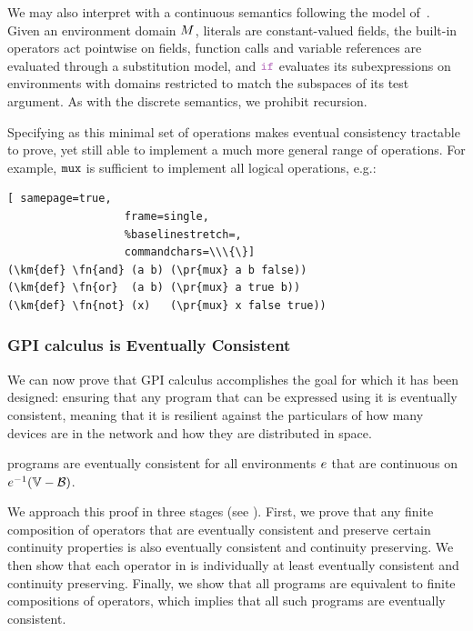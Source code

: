 \documentclass[12pt,a4paper,twoside,openright]{book}
\begin{document}
We may also interpret \calculus{} with a continuous semantics following the model of~\cite{BealUsbeck12}.
%
Given an environment domain $M$, literals are constant-valued fields, the built-in operators act pointwise on fields, function calls and variable references are evaluated through a substitution model, and $\ifN$ evaluates its subexpressions on environments with domains restricted to match the subspaces of its test argument.
%
As with the discrete semantics, we prohibit recursion.

Specifying \calculus{} as this minimal set of operations makes eventual consistency tractable to prove, yet still able to implement a much more general range of operations.
%
For example, $\texttt{mux}$ is sufficient to implement all logical operations, e.g.:
\begin{Verbatim}[ samepage=true,
                  frame=single,
                  %baselinestretch=,
                  commandchars=\\\{\}]
(\km{def} \fn{and} (a b) (\pr{mux} a b false))
(\km{def} \fn{or}  (a b) (\pr{mux} a true b))
(\km{def} \fn{not} (x)   (\pr{mux} x false true))
\end{Verbatim}

\subsubsection{GPI calculus is Eventually Consistent}

We can now prove that GPI calculus accomplishes the goal for which it has been designed: ensuring that any program that can be expressed using it is eventually consistent, meaning that it is resilient against the particulars of how many devices are in the network and how they are distributed in space.

\begin{thm}
  \calculus{} programs are eventually consistent for all environments
  $e$ that are continuous on $\validdomain{\environment}$.
\end{thm}

We approach this proof in three stages (see ).
%
First, we prove that any finite composition of operators that are eventually consistent and preserve certain continuity properties is also eventually consistent and continuity preserving.
%
We then show that each operator in \calculus{} is individually at least eventually consistent and continuity preserving.  
%
Finally, we show that all \calculus{} programs are equivalent to finite compositions of operators, which implies that all such programs are eventually consistent.
\end{document}
